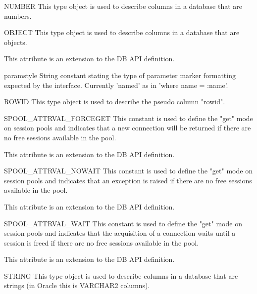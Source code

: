 \documentclass{manual}
\begin{document}
\begin{datadesc}{NUMBER}
  This type object is used to describe columns in a database that are numbers.
\end{datadesc}

\begin{datadesc}{OBJECT}
  This type object is used to describe columns in a database that are objects.

   This attribute is an extension to the DB API definition.
\end{datadesc}

\begin{datadesc}{paramstyle}
  String constant stating the type of parameter marker formatting expected by
  the interface. Currently 'named' as in 'where name = :name'.
\end{datadesc}

\begin{datadesc}{ROWID}
  This type object is used to describe the pseudo column "rowid".
\end{datadesc}

\begin{datadesc}{SPOOL_ATTRVAL_FORCEGET}
  This constant is used to define the "get" mode on session pools and indicates
  that a new connection will be returned if there are no free sessions
  available in the pool.

   This attribute is an extension to the DB API definition.
\end{datadesc}

\begin{datadesc}{SPOOL_ATTRVAL_NOWAIT}
  This constant is used to define the "get" mode on session pools and indicates
  that an exception is raised if there are no free sessions available in the
  pool.

   This attribute is an extension to the DB API definition.
\end{datadesc}

\begin{datadesc}{SPOOL_ATTRVAL_WAIT}
  This constant is used to define the "get" mode on session pools and indicates
  that the acquisition of a connection waits until a session is freed if there
  are no free sessions available in the pool.

   This attribute is an extension to the DB API definition.
\end{datadesc}

\begin{datadesc}{STRING}
  This type object is used to describe columns in a database that are strings
  (in Oracle this is VARCHAR2 columns).
\end{datadesc}
\end{document}
